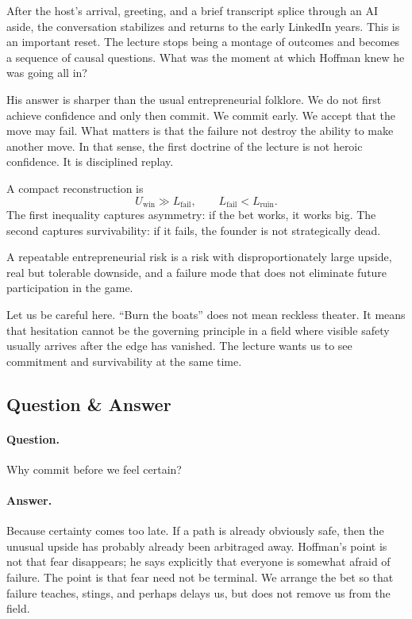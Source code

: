 After the host's arrival, greeting, and a brief transcript splice through an AI aside, the conversation stabilizes and returns to the early LinkedIn years. This is an important reset. The lecture stops being a montage of outcomes and becomes a sequence of causal questions. What was the moment at which Hoffman knew he was going all in?

His answer is sharper than the usual entrepreneurial folklore. We do not first achieve confidence and only then commit. We commit early. We accept that the move may fail. What matters is that the failure not destroy the ability to make another move. In that sense, the first doctrine of the lecture is not heroic confidence. It is disciplined replay.

A compact reconstruction is
\begin{equation}
U_{\mathrm{win}} \gg L_{\mathrm{fail}}, \qquad L_{\mathrm{fail}} < L_{\mathrm{ruin}}.
\end{equation}
The first inequality captures asymmetry: if the bet works, it works big. The second captures survivability: if it fails, the founder is not strategically dead.

\begin{definition}
A repeatable entrepreneurial risk is a risk with disproportionately large upside, real but tolerable downside, and a failure mode that does not eliminate future participation in the game.
\end{definition}

Let us be careful here. ``Burn the boats'' does not mean reckless theater. It means that hesitation cannot be the governing principle in a field where visible safety usually arrives after the edge has vanished. The lecture wants us to see commitment and survivability at the same time.

\subsection{Question \& Answer}

\paragraph{Question.}
Why commit before we feel certain?

\paragraph{Answer.}
Because certainty comes too late. If a path is already obviously safe, then the unusual upside has probably already been arbitraged away. Hoffman's point is not that fear disappears; he says explicitly that everyone is somewhat afraid of failure. The point is that fear need not be terminal. We arrange the bet so that failure teaches, stings, and perhaps delays us, but does not remove us from the field.


